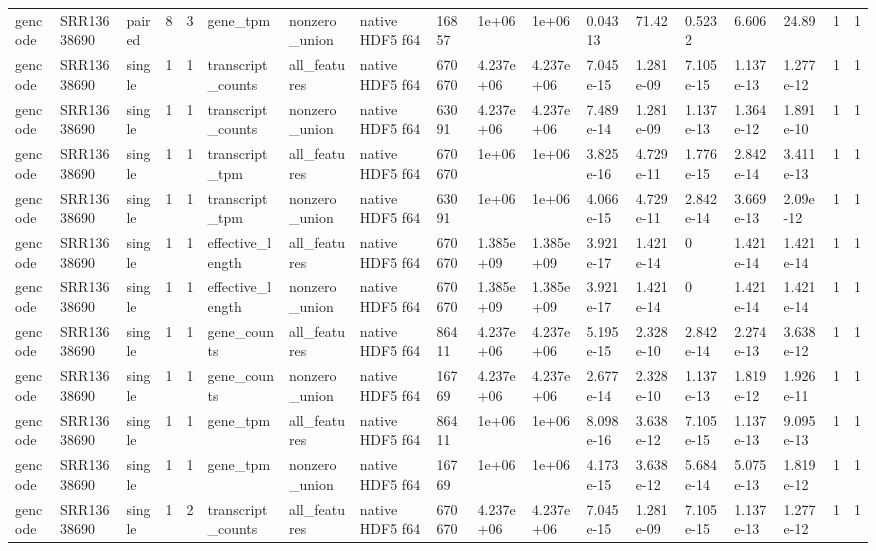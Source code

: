 \begin{tabular}{llllllllllllllllll}
gencode & SRR13638690 & paired & 8 & 3 & gene\_tpm & nonzero\_union & native HDF5 f64 & 16857 & 1e+06 & 1e+06 & 0.04313 & 71.42 & 0.5232 & 6.606 & 24.89 & 1 & 1 \\
gencode & SRR13638690 & single & 1 & 1 & transcript\_counts & all\_features & native HDF5 f64 & 670670 & 4.237e+06 & 4.237e+06 & 7.045e-15 & 1.281e-09 & 7.105e-15 & 1.137e-13 & 1.277e-12 & 1 & 1 \\
gencode & SRR13638690 & single & 1 & 1 & transcript\_counts & nonzero\_union & native HDF5 f64 & 63091 & 4.237e+06 & 4.237e+06 & 7.489e-14 & 1.281e-09 & 1.137e-13 & 1.364e-12 & 1.891e-10 & 1 & 1 \\
gencode & SRR13638690 & single & 1 & 1 & transcript\_tpm & all\_features & native HDF5 f64 & 670670 & 1e+06 & 1e+06 & 3.825e-16 & 4.729e-11 & 1.776e-15 & 2.842e-14 & 3.411e-13 & 1 & 1 \\
gencode & SRR13638690 & single & 1 & 1 & transcript\_tpm & nonzero\_union & native HDF5 f64 & 63091 & 1e+06 & 1e+06 & 4.066e-15 & 4.729e-11 & 2.842e-14 & 3.669e-13 & 2.09e-12 & 1 & 1 \\
gencode & SRR13638690 & single & 1 & 1 & effective\_length & all\_features & native HDF5 f64 & 670670 & 1.385e+09 & 1.385e+09 & 3.921e-17 & 1.421e-14 & 0 & 1.421e-14 & 1.421e-14 & 1 & 1 \\
gencode & SRR13638690 & single & 1 & 1 & effective\_length & nonzero\_union & native HDF5 f64 & 670670 & 1.385e+09 & 1.385e+09 & 3.921e-17 & 1.421e-14 & 0 & 1.421e-14 & 1.421e-14 & 1 & 1 \\
gencode & SRR13638690 & single & 1 & 1 & gene\_counts & all\_features & native HDF5 f64 & 86411 & 4.237e+06 & 4.237e+06 & 5.195e-15 & 2.328e-10 & 2.842e-14 & 2.274e-13 & 3.638e-12 & 1 & 1 \\
gencode & SRR13638690 & single & 1 & 1 & gene\_counts & nonzero\_union & native HDF5 f64 & 16769 & 4.237e+06 & 4.237e+06 & 2.677e-14 & 2.328e-10 & 1.137e-13 & 1.819e-12 & 1.926e-11 & 1 & 1 \\
gencode & SRR13638690 & single & 1 & 1 & gene\_tpm & all\_features & native HDF5 f64 & 86411 & 1e+06 & 1e+06 & 8.098e-16 & 3.638e-12 & 7.105e-15 & 1.137e-13 & 9.095e-13 & 1 & 1 \\
gencode & SRR13638690 & single & 1 & 1 & gene\_tpm & nonzero\_union & native HDF5 f64 & 16769 & 1e+06 & 1e+06 & 4.173e-15 & 3.638e-12 & 5.684e-14 & 5.075e-13 & 1.819e-12 & 1 & 1 \\
gencode & SRR13638690 & single & 1 & 2 & transcript\_counts & all\_features & native HDF5 f64 & 670670 & 4.237e+06 & 4.237e+06 & 7.045e-15 & 1.281e-09 & 7.105e-15 & 1.137e-13 & 1.277e-12 & 1 & 1 \\

\end{tabular}
